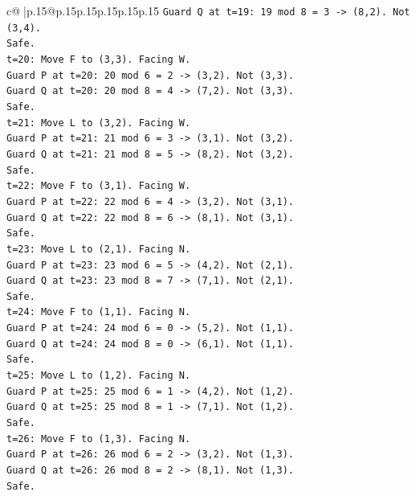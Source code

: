 \documentclass{article}
\begin{document}
{\begin{supertabular}{c@{$\;$}|p{.15\linewidth}@{}p{.15\linewidth}p{.15\linewidth}p{.15\linewidth}p{.15\linewidth}p{.15\linewidth}}
{{{\texttt{Guard Q at t=19: 19 mod 8 = 3 {-}> (8,2). Not (3,4).} \\
\texttt{Safe.} \\
\texttt{t=20: Move F to (3,3). Facing W.} \\
\texttt{Guard P at t=20: 20 mod 6 = 2 {-}> (3,2). Not (3,3).} \\
\texttt{Guard Q at t=20: 20 mod 8 = 4 {-}> (7,2). Not (3,3).} \\
\texttt{Safe.} \\
\texttt{t=21: Move L to (3,2). Facing W.} \\
\texttt{Guard P at t=21: 21 mod 6 = 3 {-}> (3,1). Not (3,2).} \\
\texttt{Guard Q at t=21: 21 mod 8 = 5 {-}> (8,2). Not (3,2).} \\
\texttt{Safe.} \\
\texttt{t=22: Move F to (3,1). Facing W.} \\
\texttt{Guard P at t=22: 22 mod 6 = 4 {-}> (3,2). Not (3,1).} \\
\texttt{Guard Q at t=22: 22 mod 8 = 6 {-}> (8,1). Not (3,1).} \\
\texttt{Safe.} \\
\texttt{t=23: Move L to (2,1). Facing N.} \\
\texttt{Guard P at t=23: 23 mod 6 = 5 {-}> (4,2). Not (2,1).} \\
\texttt{Guard Q at t=23: 23 mod 8 = 7 {-}> (7,1). Not (2,1).} \\
\texttt{Safe.} \\
\texttt{t=24: Move F to (1,1). Facing N.} \\
\texttt{Guard P at t=24: 24 mod 6 = 0 {-}> (5,2). Not (1,1).} \\
\texttt{Guard Q at t=24: 24 mod 8 = 0 {-}> (6,1). Not (1,1).} \\
\texttt{Safe.} \\
\texttt{t=25: Move L to (1,2). Facing N.} \\
\texttt{Guard P at t=25: 25 mod 6 = 1 {-}> (4,2). Not (1,2).} \\
\texttt{Guard Q at t=25: 25 mod 8 = 1 {-}> (7,1). Not (1,2).} \\
\texttt{Safe.} \\
\texttt{t=26: Move F to (1,3). Facing N.} \\
\texttt{Guard P at t=26: 26 mod 6 = 2 {-}> (3,2). Not (1,3).} \\
\texttt{Guard Q at t=26: 26 mod 8 = 2 {-}> (8,1). Not (1,3).} \\
\texttt{Safe.} \\
}}}
\end{supertabular}}
\end{document}
